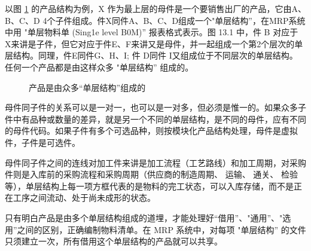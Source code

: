    以图 \ref{fig:bomBySimples} 的产品结构为例，X 作为最上层的母件是一个要销售出厂的产品，它由A、B、C、D 4个子件组成。件X同件A、B、C、D组成一个"单层结构”，在MRP系统中用 "单层物料单 (Sing1e level B0M)” 报表格式表示。图 13.1 中，件 B 对应于 X来讲是子件，但它对应于件E、F来讲又是母件，并一起组成一个第2个层次的单层结构。同理，件E同件G、H、I; 件 D同件 I又组成位于不同层次的单层结构。 任何一个产品都是由这样众多 "单层结构” 组成的。

    \begin{figure}[!htbp]
        \centering
        \caption{产品是由众多“单层结构”组成的} \label{fig:bomBySimples}
    \end{figure}

    母件同子件的关系可以是一对一，也可以是一对多，但必须是惟一的。如果众多子件中有品种或数量的差异，就是另一个不同的单层结构，是不同的母件，应有不同的母件代码。如果子件有多个可选品种，则按模块化产品结构处理，母件是虚拟件，子件是可选件。

    母件同子件之间的连线对加工件来讲是加工流程（工艺路线）和加工周期，对采购件则是入库前的采购流程和采购周期（供应商的制造周期、 运输、 通关、 检验等），单层结构上每一项方框代表的是物料的完工状态，可以入库存储，而不是正在工序之间流动、处于尚未成形的状态。

    只有明白产品是由多个单层结构组成的道埋，才能处理好“借用”、"通用”、"选用”之间的区别，正确编制物料清单。在 MRP 系统中，对每项 "单层结构” 的文件只须建立一次，所有借用这个单层结构的产品就可以共享。

